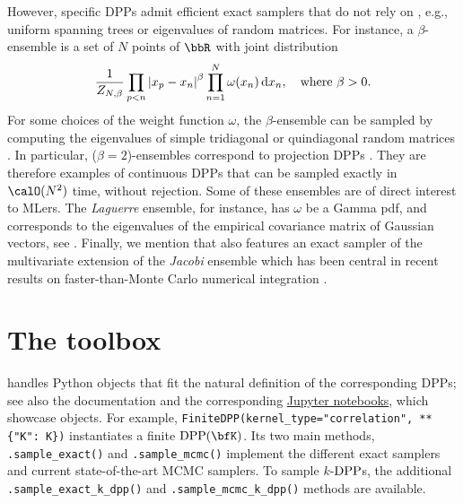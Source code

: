 \documentclass[twoside,11pt]{article}
\begin{document}
        However, specific DPPs admit efficient exact samplers that do not rely on , e.g., uniform spanning trees \citep[UST,][]{PrWi98} or eigenvalues of random matrices.
        For instance, a $\beta$-ensemble is a set of $N$ points of $\bbR$ with joint distribution
        \begin{equation*}
        \setlength{\belowdisplayskip}{0pt}
        \setlength{\belowdisplayshortskip}{0pt}
        \setlength{\abovedisplayskip}{0pt}
        \setlength{\abovedisplayshortskip}{0pt}
        \label{eq:beta_ensemble_pdf}
        \frac{1}{Z_{N,\beta}}
        \prod_{p< n}
            \lrabs{x_p-x_n}^{\beta}
        \prod_{n= 1}^N
            \omega(x_n)
            \diff x_n, \quad \text{where } \beta>0.
        \end{equation*}
        For some choices of the weight function $\omega$, the $\beta$-ensemble can be sampled by computing the eigenvalues of simple tridiagonal \citep{DuEd02} or quindiagonal random matrices \citep{KiNe04}.
        In particular, ($\beta=2$)-ensembles correspond to projection DPPs \citep{Kon05}.
        They are therefore examples of continuous DPPs that can be sampled exactly in $\calO(N^2)$ time, without rejection.
        Some of these ensembles are of direct interest to MLers.
        The \emph{Laguerre} ensemble, for instance, has $\omega$ be a Gamma pdf, and corresponds to the eigenvalues of the empirical covariance matrix of \iid Gaussian vectors, see .
        Finally, we mention that \DPPy also features an exact sampler of the  multivariate extension of the \emph{Jacobi} ensemble which has been central in recent results on faster-than-Monte Carlo numerical integration \citep{BaHa19,GaBaVa19,MaCoAm19}.



\section{The \DPPy toolbox} %
\label{sec:the_dppy_toolbox}

    \lstset{language=mypython}

    \DPPy handles Python objects that fit the natural definition of the corresponding DPPs; see also the documentation\,\,and the corresponding \href{https://github.com/guilgautier/DPPy/tree/master/notebooks}{Jupyter notebooks}, which showcase \DPPy objects.
    For example, \lstinline!FiniteDPP(kernel_type="correlation", **{"K": K})!\!
    instantiates a finite $\DPP(\bfK)$.
    Its two main methods,
    \lstinline{.sample_exact()} and
    \lstinline{.sample_mcmc()}
    implement the different exact samplers and current state-of-the-art MCMC samplers.
    To sample $k$-$\operatorname{DPP}$s, the additional
    \lstinline{.sample_exact_k_dpp()} and
    \lstinline{.sample_mcmc_k_dpp()} methods are available.
\end{document}
